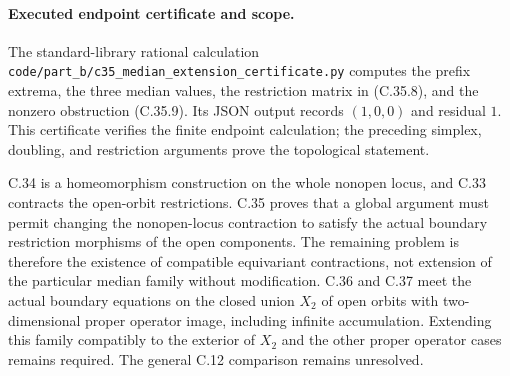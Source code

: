 \paragraph{Executed endpoint certificate and scope.}
The standard-library rational calculation
\texttt{code/part\_b/c35\_median\_extension\_certificate.py}
computes the prefix extrema, the three median
values, the restriction matrix in (C.35.8),
and the nonzero obstruction (C.35.9).
Its JSON output records $(1,0,0)$ and residual $1$.
This certificate verifies the finite endpoint
calculation; the preceding simplex, doubling,
and restriction arguments prove the topological
statement.

C.34 is a homeomorphism construction on the whole
nonopen locus, and C.33 contracts the open-orbit
restrictions. C.35 proves that a global argument
must permit changing the nonopen-locus contraction
to satisfy the actual boundary restriction
morphisms of the open components. The remaining
problem is therefore the existence of compatible
equivariant contractions, not extension of the
particular median family without modification.
C.36 and C.37 meet the actual boundary equations on
the closed union $X_2$ of open orbits with
two-dimensional proper operator image, including
infinite accumulation. Extending this family
compatibly to the exterior of $X_2$ and the other
proper operator cases remains required.
The general C.12 comparison remains unresolved.
